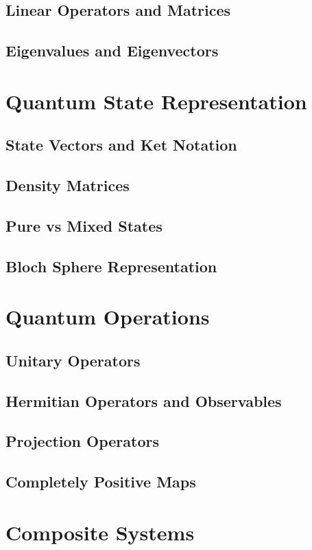 \documentclass[12pt,a4paper]{book}
\begin{document}
\subsection{Linear Operators and Matrices}
\subsection{Eigenvalues and Eigenvectors}

\section{Quantum State Representation}
\subsection{State Vectors and Ket Notation}
\subsection{Density Matrices}
\subsection{Pure vs Mixed States}
\subsection{Bloch Sphere Representation}

\section{Quantum Operations}
\subsection{Unitary Operators}
\subsection{Hermitian Operators and Observables}
\subsection{Projection Operators}
\subsection{Completely Positive Maps}

\section{Composite Systems}
\end{document}
